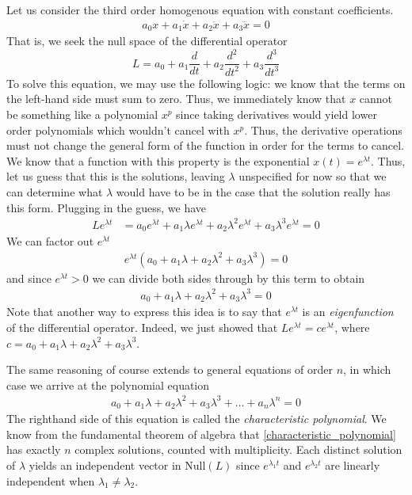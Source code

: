 \documentclass[12pt]{article}
\begin{document}
\bigskip
Let us consider the third order homogenous equation with constant coefficients. 
\begin{align*}
a_0 x + a_1 \dot{x} + a_2 \ddot{x} + a_3 \dddot{x} = 0 
\end{align*}
That is, we seek the null space of the differential operator 
\[L = a_0 + a_1 \frac{d}{dt} + a_2 \frac{d^2}{dt^2} + a_3 \frac{d^3}{dt^3} \]
To solve this equation, we may use the following logic: we know that the terms on the left-hand side must sum to zero. Thus, we immediately 
know that $x$ cannot be something like a polynomial $x^p$ since taking derivatives would yield lower order polynomials which wouldn't cancel with 
$x^p$. Thus, the derivative operations must not change the general form of the function in order for the terms to cancel. We know that a function with 
this property is the exponential $x(t) = e^{\lambda t}$. Thus, let us guess that this is the solutions, leaving $\lambda$ unspecified for now so that we can 
determine what $\lambda$ would have to be in the case that the solution really has this form. Plugging in the guess, we have 
\begin{align*}
L e^{\lambda t} &= a_0 e^{\lambda t} + a_1 \lambda e^{\lambda t} +  a_2 \lambda^2 e^{\lambda t} +  a_3 \lambda^3 e^{\lambda t} = 0
\end{align*} 
We can factor out $e^{\lambda t}$
\begin{align*}
e^{\lambda t} \left(a_0 + a_1 \lambda + a_2 \lambda^2 + a_3 \lambda^3 \right) = 0
\end{align*} 
and since $e^{\lambda t} > 0$ we can divide both sides through by this term to obtain 
\begin{align*}
a_0 + a_1 \lambda + a_2 \lambda^2 + a_3 \lambda^3 = 0
\end{align*}
Note that another way to express this idea is to say that $e^{\lambda t}$ is an \textit{eigenfunction} of the differential operator. Indeed, we just showed that 
$L e^{\lambda t} = ce^{\lambda t}$, where $c = a_0 + a_1 \lambda + a_2 \lambda^2 + a_3 \lambda^3$. 

The same reasoning of course extends to general equations of order $n$, in which case we arrive at the polynomial equation
\begin{align*}
a_0 + a_1 \lambda + a_2 \lambda^2 + a_3 \lambda^3  + \dots + a_n \lambda^n= 0 \label{characteristic_polynomial}
\end{align*}
The righthand side of this equation is called the \textit{characteristic polynomial}. 
We know from the fundamental theorem of algebra that \ref{characteristic_polynomial} has exactly $n$ complex solutions, counted with multiplicity. 
Each distinct solution of $\lambda$ yields an independent vector in $\text{Null}(L)$ since $e^{\lambda_1 t}$ and $e^{\lambda_2 t}$ are linearly 
independent when $\lambda_1 \neq \lambda_2$. 
\end{document}
